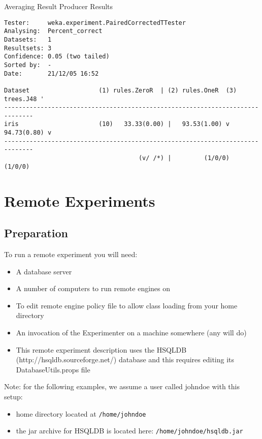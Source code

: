 \documentclass[a4paper]{article}
\begin{document}
Averaging Result Producer Results

\begin{verbatim}
Tester:     weka.experiment.PairedCorrectedTTester
Analysing:  Percent_correct
Datasets:   1
Resultsets: 3
Confidence: 0.05 (two tailed)
Sorted by:  -
Date:       21/12/05 16:52

Dataset                   (1) rules.ZeroR  | (2) rules.OneR  (3) trees.J48 '
------------------------------------------------------------------------------
iris                      (10)   33.33(0.00) |   93.53(1.00) v   94.73(0.80) v
------------------------------------------------------------------------------
                                     (v/ /*) |         (1/0/0)         (1/0/0)

\end{verbatim}


\newpage
\section{Remote Experiments}

\subsection{Preparation}

To run a remote experiment you will need:

\begin{itemize}
   \item A database server
   \item A number of computers to run remote engines on
   \item To edit remote engine policy file to allow class loading from your home directory
   \item An invocation of the Experimenter on a machine somewhere (any will do)
   \item This remote experiment description uses the HSQLDB (http://hsqldb.sourceforge.net/) database and this requires editing its DatabaseUtils.props file 
\end{itemize}

Note: for the following examples, we assume a user called johndoe with this setup:

\begin{itemize}
   \item home directory located at \texttt{/home/johndoe} 
	\item the jar archive for HSQLDB is located here: \texttt{/home/johndoe/hsqldb.jar} 
\end{itemize}
\end{document}
